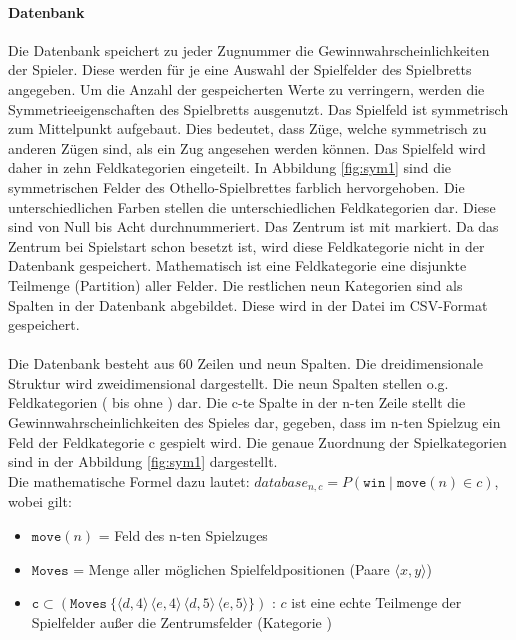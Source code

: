 \paragraph{Datenbank}
\label{para:db}
Die Datenbank speichert zu jeder Zugnummer die Gewinnwahrscheinlichkeiten der Spieler. Diese werden für je eine Auswahl der Spielfelder des Spielbretts angegeben. Um die Anzahl der gespeicherten Werte zu verringern, werden die Symmetrieeigenschaften des Spielbretts ausgenutzt. 
Das Spielfeld ist symmetrisch zum Mittelpunkt aufgebaut. Dies bedeutet, dass Züge, welche symmetrisch zu anderen Zügen sind, als ein Zug angesehen werden können. Das Spielfeld wird daher in zehn Feldkategorien eingeteilt. In Abbildung \ref{fig:sym1} sind die symmetrischen Felder des Othello-Spielbrettes farblich hervorgehoben. Die unterschiedlichen Farben stellen die unterschiedlichen Feldkategorien dar. Diese sind von Null bis Acht durchnummeriert. Das Zentrum ist mit  markiert. Da das Zentrum bei Spielstart schon besetzt ist, wird diese Feldkategorie nicht in der Datenbank gespeichert. Mathematisch ist eine Feldkategorie eine disjunkte Teilmenge (Partition) aller Felder. Die restlichen neun Kategorien sind als Spalten in der Datenbank abgebildet. Diese wird in der Datei  im CSV-Format gespeichert.
\\
\\Die Datenbank besteht aus 60 Zeilen und neun Spalten. Die dreidimensionale Struktur wird zweidimensional dargestellt. Die neun Spalten stellen o.g. Feldkategorien ( bis  ohne ) dar. Die c-te Spalte in der n-ten Zeile stellt die Gewinnwahrscheinlichkeiten des Spieles dar, gegeben, dass im n-ten Spielzug ein Feld der Feldkategorie c gespielt wird. Die genaue Zuordnung der Spielkategorien sind in der Abbildung \ref{fig:sym1} dargestellt.
\\Die mathematische Formel dazu lautet:
$database_{n,c} = P( \mathtt{win} \mid \mathtt{move}(n) \in c)$, wobei gilt:
\begin{itemize}
\item $\mathtt{move}(n)$ = Feld des n-ten Spielzuges
\item $\mathtt{Moves}$ = Menge aller möglichen Spielfeldpositionen (Paare $\langle x ,y \rangle$)
\item $\mathtt{c} \subset (\mathtt{Moves} \ \{\langle d,4 \rangle\,\langle e,4 \rangle\,\langle d,5 \rangle\,\langle e,5 \rangle\} )$ : $c$ ist eine echte Teilmenge der Spielfelder außer die Zentrumsfelder (Kategorie )
\end{itemize}
